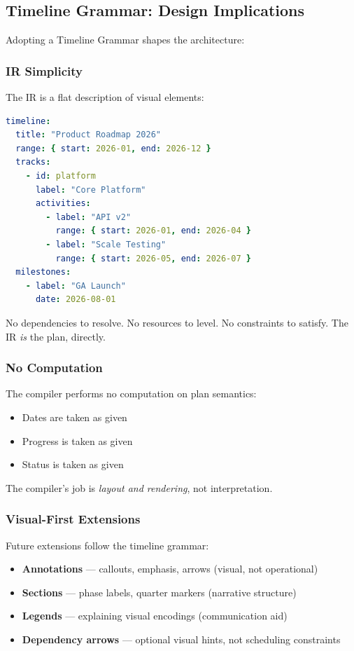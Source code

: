 \subsection{Timeline Grammar: Design Implications}

Adopting a Timeline Grammar shapes the architecture:

\subsubsection{IR Simplicity}

The IR is a flat description of visual elements:
\begin{lstlisting}[language=yaml]
timeline:
  title: "Product Roadmap 2026"
  range: { start: 2026-01, end: 2026-12 }
  tracks:
    - id: platform
      label: "Core Platform"
      activities:
        - label: "API v2"
          range: { start: 2026-01, end: 2026-04 }
        - label: "Scale Testing"
          range: { start: 2026-05, end: 2026-07 }
  milestones:
    - label: "GA Launch"
      date: 2026-08-01
\end{lstlisting}

No dependencies to resolve. No resources to level. No constraints to satisfy. The IR \emph{is} the plan, directly.

\subsubsection{No Computation}

The compiler performs no computation on plan semantics:
\begin{itemize}
  \item Dates are taken as given
  \item Progress is taken as given
  \item Status is taken as given
\end{itemize}

The compiler's job is \emph{layout and rendering}, not interpretation.

\subsubsection{Visual-First Extensions}

Future extensions follow the timeline grammar:
\begin{itemize}
  \item \textbf{Annotations} — callouts, emphasis, arrows (visual, not operational)
  \item \textbf{Sections} — phase labels, quarter markers (narrative structure)
  \item \textbf{Legends} — explaining visual encodings (communication aid)
  \item \textbf{Dependency arrows} — optional visual hints, not scheduling constraints
\end{itemize}

